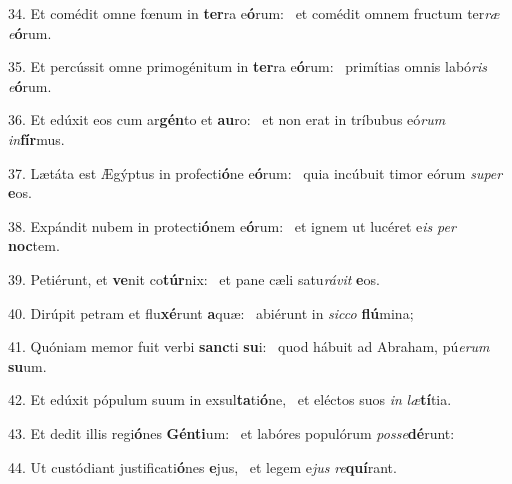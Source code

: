 34. Et comédit omne fœnum in \textbf{ter}ra e\textbf{ó}rum: \ast\  et comédit omnem fructum ter\textit{ræ} \textit{e}\textbf{ó}rum.\

35. Et percússit omne primogénitum in \textbf{ter}ra e\textbf{ó}rum: \ast\  primítias omnis labó\textit{ris} \textit{e}\textbf{ó}rum.\

36. Et edúxit eos cum ar\textbf{gén}to et \textbf{au}ro: \ast\  et non erat in tríbubus eó\textit{rum} \textit{in}\textbf{fír}mus.\

37. Lætáta est Ægýptus in profecti\textbf{ó}ne e\textbf{ó}rum: \ast\  quia incúbuit timor eórum \textit{su}\textit{per} \textbf{e}os.\

38. Expándit nubem in protecti\textbf{ó}nem e\textbf{ó}rum: \ast\  et ignem ut lucéret e\textit{is} \textit{per} \textbf{noc}tem.\

39. Petiérunt, et \textbf{ve}nit co\textbf{túr}nix: \ast\  et pane cæli satu\textit{rá}\textit{vit} \textbf{e}os.\

40. Dirúpit petram et flu\textbf{xé}runt \textbf{a}quæ: \ast\  abiérunt in \textit{sic}\textit{co} \textbf{flú}mina;\

41. Quóniam memor fuit verbi \textbf{sanc}ti \textbf{su}i: \ast\  quod hábuit ad Abraham, pú\textit{e}\textit{rum} \textbf{su}um.\

42. Et edúxit pópulum suum in exsul\textbf{ta}ti\textbf{ó}ne, \ast\  et eléctos suos \textit{in} \textit{læ}\textbf{tí}tia.\

43. Et dedit illis regi\textbf{ó}nes \textbf{Gén}\textbf{ti}um: \ast\  et labóres populórum \textit{pos}\textit{se}\textbf{dé}runt:\

44. Ut custódiant justificati\textbf{ó}nes \textbf{e}jus, \ast\  et legem e\textit{jus} \textit{re}\textbf{quí}rant.\


